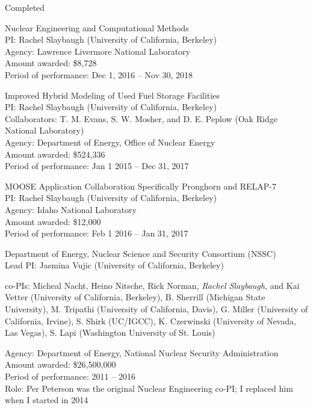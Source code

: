 
\begin{rSubsection}{Completed}{}{}{}
\item Nuclear Engineering and Computational Methods\\
PI: Rachel Slaybaugh (University of California, Berkeley)\\
Agency: Lawrence Livermore National Laboratory \\
Amount awarded: \$8,728\\
Period of performance: Dec 1, 2016 -- Nov 30, 2018	

\vspace*{0.3 em}
\item Improved Hybrid Modeling of Used Fuel Storage Facilities\\
PI: Rachel Slaybaugh (University of California, Berkeley)\\
\hspace*{1 em}  Collaborators: T. M. Evans, S. W. Mosher, and D. E. Peplow (Oak Ridge National Laboratory)\\
Agency: Department of Energy, Office of Nuclear Energy \\
Amount awarded: \$524,336\\
Period of performance: Jan 1 2015 -- Dec 31, 2017

\vspace*{0.3 em}
\item MOOSE Application Collaboration Specifically Pronghorn and RELAP-7\\ 
PI: Rachel Slaybaugh (University of California, Berkeley)\\
Agency: Idaho National Laboratory \\
Amount awarded: \$12,000\\
Period of performance: Feb 1 2016 -- Jan 31, 2017

\vspace*{0.3 em}
\item Department of Energy, Nuclear Science and Security Consortium (NSSC)\\
Lead PI: Jasmina Vujic (University of California, Berkeley)
\vspace*{-.6 em}
\begin{addmargin}[1em]{0 em}
co-PIs: Micheal Nacht, Heino Nitsche, Rick Norman, \textit{Rachel Slaybaugh}, and Kai Vetter (University of California, Berkeley), B. Sherrill  (Michigan State University), M. Tripathi (University of California, Davis), G. Miller (University of California, Irvine), S. Shirk (UC/IGCC), K. Czerwinski (University of Nevada, Las Vegas), S. Lapi (Washington University of St. Louis)
\end{addmargin}
\vspace*{-.6 em}
Agency:  Department of Energy, National Nuclear Security Administration\\
Amount awarded: \$26,500,000\\
Period of performance: 2011 -- 2016\\
Role: Per Peterson was the original Nuclear Engineering co-PI; I replaced him when I started in 2014
\end{rSubsection}



